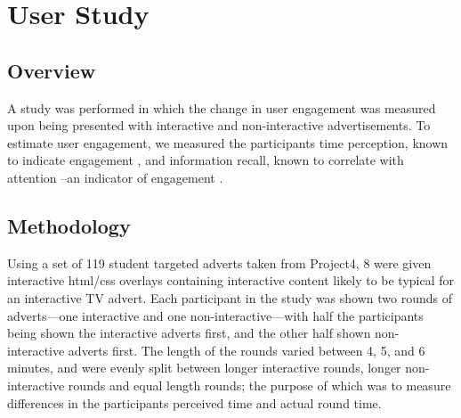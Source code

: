 \section{User Study}
	\label{sec:user_study}
	\subsection{Overview}
	A study was performed in which the change in user engagement was measured upon being presented with interactive and non-interactive advertisements. To estimate user engagement, we measured the participants time perception, known to indicate engagement \citep{yahoo-intrusive-advertising}, and information recall, known to correlate with attention \citep{interactions_attention_memory}--an indicator of engagement \cite{what_is_engagement}.

	\subsection{Methodology}
	Using a set of 119 student targeted adverts taken from Project4, 8 were given interactive html/css overlays containing interactive content likely to be typical for an interactive TV advert. Each participant in the study was shown two rounds of adverts---one interactive and one non-interactive---with half the participants being shown the interactive adverts first, and the other half shown non-interactive adverts first. The length of the rounds varied between 4, 5, and 6 minutes, and were evenly split between longer interactive rounds, longer non-interactive rounds and equal length rounds; the purpose of which was to measure differences in the participants perceived time and actual round time. 

